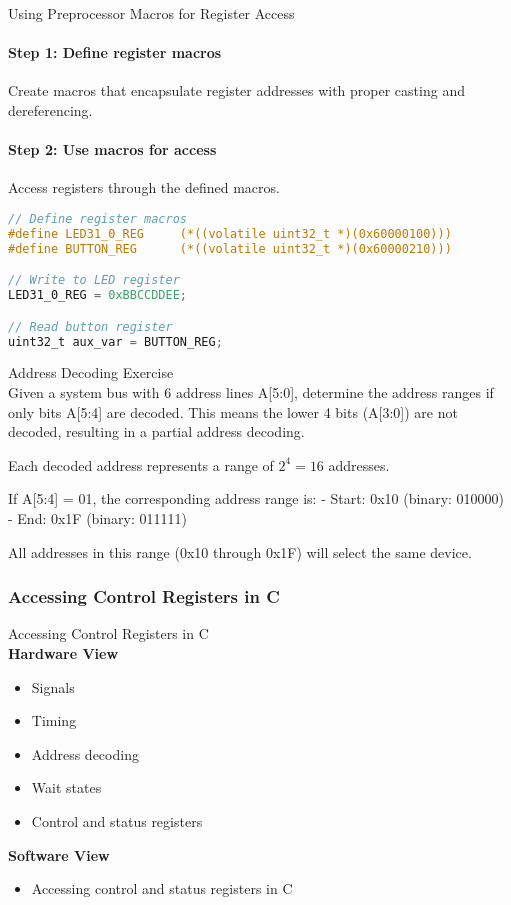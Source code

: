 \begin{KR}{Using Preprocessor Macros for Register Access}
\paragraph{Step 1: Define register macros}
Create macros that encapsulate register addresses with proper casting and dereferencing.
\paragraph{Step 2: Use macros for access}
Access registers through the defined macros.

\begin{lstlisting}[language=C, style=basesmol]
// Define register macros
#define LED31_0_REG     (*((volatile uint32_t *)(0x60000100)))
#define BUTTON_REG      (*((volatile uint32_t *)(0x60000210)))

// Write to LED register
LED31_0_REG = 0xBBCCDDEE;

// Read button register
uint32_t aux_var = BUTTON_REG;
\end{lstlisting}
\end{KR}

\begin{example2}{Address Decoding Exercise}\\
Given a system bus with 6 address lines A[5:0], determine the address ranges if only bits A[5:4] are decoded.
\tcblower
This means the lower 4 bits (A[3:0]) are not decoded, resulting in a partial address decoding.

Each decoded address represents a range of $2^4 = 16$ addresses.

If A[5:4] = 01, the corresponding address range is:
- Start: 0x10 (binary: 010000)
- End: 0x1F (binary: 011111)

All addresses in this range (0x10 through 0x1F) will select the same device.
\end{example2}

\subsubsection{Accessing Control Registers in C}

\begin{definition}{Accessing Control Registers in C}\\
    \textbf{Hardware View}
    \begin{itemize}
        \item Signals
        \item Timing
        \item Address decoding
        \item Wait states
        \item Control and status registers
    \end{itemize}
    \textbf{Software View}
    \begin{itemize}
        \item Accessing control and status registers in C
    \end{itemize}
\end{definition}

